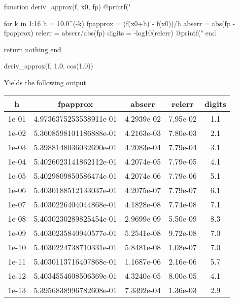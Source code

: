 \documentclass{report}
\begin{document}
\begin{itemize}
\begin{jlcode}
function deriv_approx(f, x0, fp)
    @printf("%

    for k in 1:16
        h = 10.0^(-k)
        fpapprox = (f(x0+h) - f(x0))/h
        abserr = abs(fp - fpapprox)
        relerr = abserr/abs(fp)
        digits = -log10(relerr)
        @printf("%
    end
    
    return nothing
end

deriv_approx(f, 1.0, cos(1.0))
            \end{jlcode}
            \bigbreak \noindent 
            Yields the following output
            \begin{center}
                \begin{tabular}{c|c|c|c|c}
                    h                 &fpapprox       &abserr     &relerr   &digits \\
                    \hline
                    1e-01   &4.9736375253538911e-01   &4.2939e-02   &7.95e-02      &1.1\\
                    1e-02   &5.3608598101186888e-01   &4.2163e-03   &7.80e-03      &2.1\\
                    1e-03   &5.3988148036032690e-01   &4.2083e-04   &7.79e-04      &3.1\\
                    1e-04   &5.4026023141862112e-01   &4.2074e-05   &7.79e-05      &4.1\\
                    1e-05   &5.4029809850586474e-01   &4.2074e-06   &7.79e-06      &5.1\\
                    1e-06   &5.4030188512133037e-01   &4.2075e-07   &7.79e-07      &6.1\\
                    1e-07   &5.4030226404044868e-01   &4.1828e-08   &7.74e-08      &7.1\\
                    1e-08   &5.4030230289825454e-01   &2.9699e-09   &5.50e-09      &8.3\\
                    1e-09   &5.4030235840940577e-01   &5.2541e-08   &9.72e-08      &7.0\\
                    1e-10   &5.4030224738710331e-01   &5.8481e-08   &1.08e-07      &7.0\\
                    1e-11   &5.4030113716407868e-01   &1.1687e-06   &2.16e-06      &5.7\\
                    1e-12   &5.4034554608506369e-01   &4.3240e-05   &8.00e-05      &4.1\\
                    1e-13   &5.3956838996782608e-01   &7.3392e-04   &1.36e-03      &2.9\\

\end{tabular}
\end{center}
\end{itemize}
\end{document}
